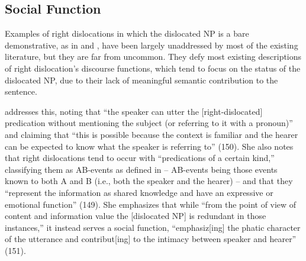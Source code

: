 \documentclass[titlepage,12pt]{article}
\begin{document}


\subsection{Social Function} \label{socfunc}

 Examples of right dislocations in which the dislocated NP is a bare demonstrative, as in \Last and \LLast, have been largely unaddressed by most of the existing literature, but they are far from uncommon. They defy most existing descriptions of right dislocation's discourse functions, which tend to focus on the status of the dislocated NP, due to their lack of meaningful semantic contribution to the sentence.
 
 \citet{aijmer_themes_1989} addresses this, noting that ``the speaker can utter the [right-dislocated] predication without mentioning the subject (or referring to it with a pronoun)'' and claiming that ``this is possible because the context is familiar and the hearer can be expected to know what the speaker is referring to'' (150). She also notes that right dislocations tend to occur with ``predications of a certain kind,'' classifying them as AB-events as defined in \citealt{labov_therapeutic_1977} -- AB-events being those events known to both A and B (i.e., both the speaker and the hearer) -- and that they ``represent the information as shared knowledge and have an expressive or emotional function'' (149). She emphasizes that while ``from the point of view of content and information value the [dislocated NP] is redundant in those instances,'' it instead serves a social function, ``emphasiz[ing] the phatic character of the utterance and contribut[ing] to the intimacy between speaker and hearer'' (151).
\end{document}
